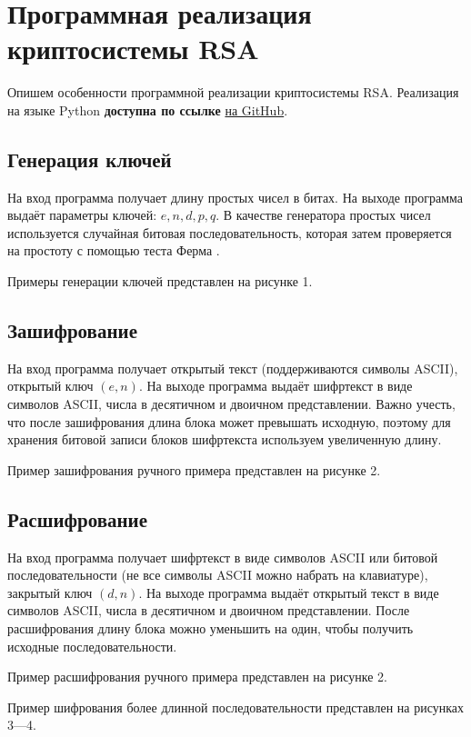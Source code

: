 \section{Программная реализация криптосистемы RSA}
Опишем особенности программной реализации криптосистемы RSA.
Реализация на языке Python {\bf доступна по ссылке} \href{https://github.com/shadrunov/mathmethods-labs/tree/lab4-rsa}{на GitHub}.

\subsection{Генерация ключей}
На вход программа получает длину простых чисел в битах. На выходе программа выдаёт параметры ключей: $e, n, d, p, q$. В качестве генератора простых чисел используется случайная битовая последовательность, которая затем проверяется на простоту с помощью теста Ферма \cite{medium:prime}.

Примеры генерации ключей представлен на рисунке 1.

\subsection{Зашифрование}
На вход программа получает открытый текст (поддерживаются символы ASCII), открытый ключ $(e, n)$. На выходе программа выдаёт шифртекст в виде символов ASCII, числа в десятичном и двоичном представлении. Важно учесть, что после зашифрования длина блока может превышать исходную, поэтому для хранения битовой записи блоков шифртекста используем увеличенную длину.

Пример зашифрования ручного примера представлен на рисунке 2.

\subsection{Расшифрование}
На вход программа получает шифртекст в виде символов ASCII или битовой последовательности (не все символы ASCII можно набрать на клавиатуре), закрытый ключ $(d, n)$. На выходе программа выдаёт открытый текст в виде символов ASCII, числа в десятичном и двоичном представлении. После расшифрования длину блока можно уменьшить на один, чтобы получить исходные последовательности.

Пример расшифрования ручного примера представлен на рисунке 2.


Пример шифрования более длинной последовательности представлен на рисунках 3—4.
\FloatBarrier
\clearpage



